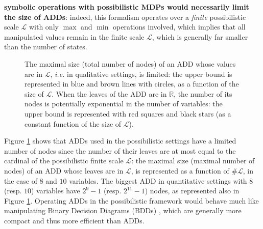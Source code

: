 \textbf{symbolic operations with possibilistic MDPs would necessarily
limit the size of ADDs}: indeed, this formalism operates over a \emph{finite}
possibilistic scale $\mathcal{L}$ with only $\max$ and $\min$ operations involved,
which implies that all manipulated values remain in the %
finite scale $\mathcal{L}$, which is generally far smaller than the number of states.
\begin{figure} \centering
{}
\caption[Limitations of the maximal size of an ADD in the possibilistic settings]{
The maximal size (total number of nodes) 
of an ADD whose values are in $\mathcal{L}$,
\textit{i.e.} in qualitative settings, is limited:
the upper bound is represented in blue and brown lines with circles,
as a function of the size of $\mathcal{L}$.
When the leaves of the ADD are in $\mathbb{R}$,
the number of its nodes is potentially exponential in the number of variables:
the upper bound is represented with red squares and black stars
(as a constant function of the size of $\mathcal{L}$).}
\label{ADDsize}
\end{figure}

Figure \ref{ADDsize} shows that 
ADDs used in the possibilistic settings 
have a limited number of nodes
since the number of their leaves 
are at most equal 
to the cardinal of the possibilistic
finite scale $\mathcal{L}$:
the maximal size (maximal number of nodes) of an ADD
whose leaves are in $\mathcal{L}$, is represented
as a function of $\# \mathcal{L}$,
in the case of $8$ and $10$ variables. 
The biggest ADD in quantitative settings
with $8$ (resp. $10$) variables 
have $2^9-1$ (resp. $2^{11}-1$) nodes,
as represented also in Figure \ref{ADDsize}.
Operating ADDs in the possibilistic framework would behave much
like manipulating Binary Decision Diagrams (BDDs)
\cite{Bryant92symbolicboolean}, which are generally more compact and thus more
efficient than ADDs. 

